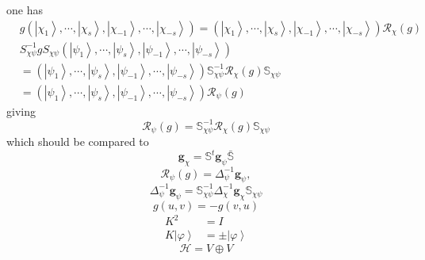 \documentclass[aps,preprint]{revtex4}%
\begin{document}
one has
\begin{align}
&  g\left(  \left\vert \chi_{1}\right\rangle ,\cdots,\left\vert \chi
_{s}\right\rangle ,\left\vert \chi_{-1}\right\rangle ,\cdots,\left\vert
\chi_{-s}\right\rangle \right)  =\left(  \left\vert \chi_{1}\right\rangle
,\cdots,\left\vert \chi_{s}\right\rangle ,\left\vert \chi_{-1}\right\rangle
,\cdots,\left\vert \chi_{-s}\right\rangle \right)  \mathcal{R}_{\chi}\left(
g\right)  \nonumber\\
&  S_{\chi\psi}^{-1}gS_{\chi\psi}\left(  \left\vert \psi_{1}\right\rangle
,\cdots,\left\vert \psi_{s}\right\rangle ,\left\vert \psi_{-1}\right\rangle
,\cdots,\left\vert \psi_{-s}\right\rangle \right)  \nonumber\\
&  =\left(  \left\vert \psi_{1}\right\rangle ,\cdots,\left\vert \psi
_{s}\right\rangle ,\left\vert \psi_{-1}\right\rangle ,\cdots,\left\vert
\psi_{-s}\right\rangle \right)  \mathbb{S}_{\chi\psi}^{-1}\mathcal{R}_{\chi
}\left(  g\right)  \mathbb{S}_{\chi\psi}\nonumber\\
&  =\left(  \left\vert \psi_{1}\right\rangle ,\cdots,\left\vert \psi
_{s}\right\rangle ,\left\vert \psi_{-1}\right\rangle ,\cdots,\left\vert
\psi_{-s}\right\rangle \right)  \mathcal{R}_{\psi}\left(  g\right)
\end{align}
giving
\begin{equation}
\mathcal{R}_{\psi}\left(  g\right)  =\mathbb{S}_{\chi\psi}^{-1}\mathcal{R}%
_{\chi}\left(  g\right)  \mathbb{S}_{\chi\psi}%
\end{equation}
which should be compared to
\begin{equation}
\mathbf{g}_{\chi}=\mathbb{S}^{t}\mathbf{g}_{\psi}\mathbb{\bar{S}}%
\end{equation}%
\begin{equation}
\mathcal{R}_{\psi}\left(  g\right)  =\Delta_{\psi}^{-1}\mathbf{g}_{\psi},
\end{equation}%
\begin{equation}
\Delta_{\psi}^{-1}\mathbf{g}_{\psi}=\mathbb{S}_{\chi\psi}^{-1}\Delta_{\chi
}^{-1}\mathbf{g}_{\chi}\mathbb{S}_{\chi\psi}%
\end{equation}%
\begin{equation}
g\left(  u,v\right)  =-g\left(  v,u\right)
\end{equation}%
\begin{align}
K^{2}  & =I\\
K\left\vert \varphi\right\rangle  & =\pm\left\vert \varphi\right\rangle
\end{align}%
\begin{equation}
\mathcal{H}=V\oplus V
\end{equation}%
\end{document}
